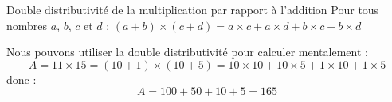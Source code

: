 \documentclass[a4paper,dvipsnames]{article}
\begin{document}

\begin{PpT}{Double distributivité de la multiplication par rapport à l'addition}
Pour tous nombres $a$, $b$, $c$ et $d$ : $(a+b)\times(c+d)=a\times c+a\times d+b\times c+b\times d$
\end{PpT}

\begin{Ex}
Nous pouvons utiliser la double distributivité pour calculer mentalement :
\[A=11\times15=(10+1)\times(10+5)=10\times10+10\times5+1\times10+1\times5\]
donc :
\[A=100+50+10+5=165\]
\end{Ex}
\end{document}

